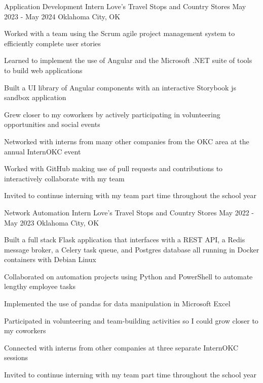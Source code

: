 \documentclass[letterpaper]{resumeconfig}
\begin{document}
\WorkExperience
    {Application Development Intern} %
    {Love's Travel Stops and Country Stores} %
    {May 2023 - May 2024} %
    {Oklahoma City, OK} %
    {
        \item Worked with a team using the Scrum agile project management system to efficiently complete user stories
        \item Learned to implement the use of Angular and the Microsoft .NET suite of tools to build web applications
        \item Built a UI library of Angular components with an interactive Storybook js sandbox application
        \item Grew closer to my coworkers by actively participating in volunteering opportunities and social events
        \item Networked with interns from many other companies from the OKC area at the annual InternOKC event
        \item Worked with GitHub making use of pull requests and contributions to interactively collaborate with my team
        \item Invited to continue interning with my team part time throughout the school year
    }
    \vspace{1em}

\WorkExperience
    {Network Automation Intern} %
    {Love's Travel Stops and Country Stores} %
    {May 2022 - May 2023} %
    {Oklahoma City, OK} %
    {
    	\item Built a full stack Flask application that interfaces with a REST API, a Redis message broker, a Celery task queue, and Postgres database all running in Docker containers with Debian Linux
        \item Collaborated on automation projects using Python and PowerShell to automate lengthy employee tasks
        \item Implemented the use of pandas for data manipulation in Microsoft Excel
        \item Participated in volunteering and team-building activities so I could grow closer to my coworkers
        \item Connected with interns from other companies at three separate InternOKC sessions
        \item Invited to continue interning with my team part time throughout the school year
    }
    
\end{document}

